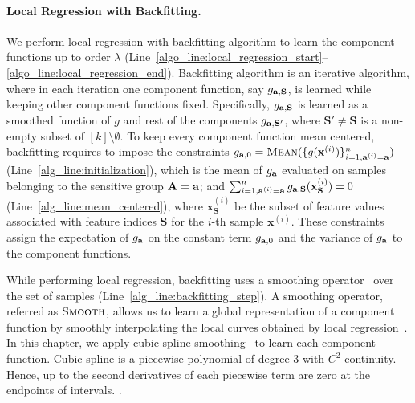 \paragraph{Local Regression with Backfitting.} We perform local regression with backfitting algorithm to learn the component functions up to order $ \lambda $ (Line~\ref{algo_line:local_regression_start}--\ref{algo_line:local_regression_end}). Backfitting algorithm is an iterative algorithm, where in each iteration one component function, say $ g_{\mathbf{a}, \mathbf{S}} $, is learned while keeping other component functions fixed. Specifically, $ g_{\mathbf{a}, \mathbf{S}} $ is learned as a smoothed function of $ g $ and rest of the components $ g_{\mathbf{a}, \mathbf{S}'} $, where $ \mathbf{S}' \ne \mathbf{S} $ is a non-empty subset of $ [k]\setminus \emptyset $. To keep every component function mean centered, backfitting requires to impose the constraints $ g_{\mathbf{a}, 0} = \textsc{Mean}(\{g(\mathbf{x}^{(i)})\}_{i=1, \mathbf{a}^{(i)} = \mathbf{a}}^n) $ (Line~\ref{alg_line:initialization}), which is the mean of $ g_{\mathbf{a}} $ evaluated on samples belonging to the sensitive group $ \mathbf{A} = \mathbf{a} $;  and $ \sum_{i=1, \mathbf{a}^{(i)} = \mathbf{a}}^ng_{\mathbf{a}, \mathbf{S}}(\mathbf{x}_{\mathbf{S}}^{(i)}) = 0$ (Line~\ref{alg_line:mean_centered}), where $ \mathbf{x}_{\mathbf{S}}^{(i)} $ be the subset of feature values associated with feature indices $ \mathbf{S} $ for the $ i $-th sample $ \mathbf{x}^{(i)} $. These constraints assign the expectation of $ g_{\mathbf{a}} $ on the constant term $ g_{\mathbf{a}, 0} $ and the variance of $ g_{\mathbf{a}} $ to the component functions.                                       


While performing local regression, backfitting uses a smoothing operator~\cite{loader2012smoothing} over the set of samples (Line~\ref{alg_line:backfitting_step}). A smoothing operator, referred as $ \textsc{Smooth} $, allows us to learn a global representation of a component function by smoothly interpolating the local curves obtained by local regression~\cite{loader2012smoothing}. In this chapter, we apply cubic spline smoothing~\cite{li2010global} to learn each component function. Cubic spline is a piecewise polynomial of degree $ 3 $ with $ C^2 $ continuity. Hence, up to the second derivatives of each piecewise term are zero at the endpoints of intervals. .%


